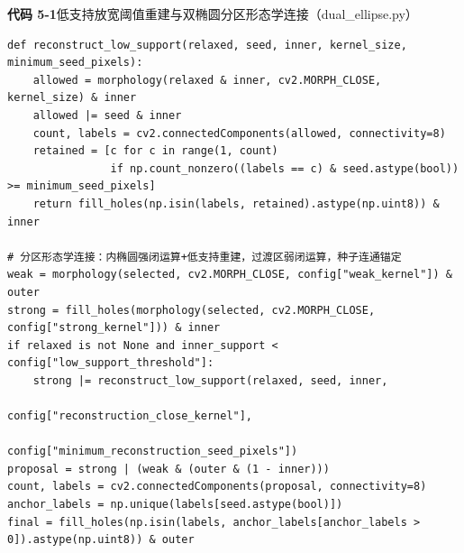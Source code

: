 \noindent\textbf{代码 5-1}\quad 低支持放宽阈值重建与双椭圆分区形态学连接（dual\_ellipse.py）
\begin{lstlisting}
def reconstruct_low_support(relaxed, seed, inner, kernel_size, minimum_seed_pixels):
    allowed = morphology(relaxed & inner, cv2.MORPH_CLOSE, kernel_size) & inner
    allowed |= seed & inner
    count, labels = cv2.connectedComponents(allowed, connectivity=8)
    retained = [c for c in range(1, count)
                if np.count_nonzero((labels == c) & seed.astype(bool)) >= minimum_seed_pixels]
    return fill_holes(np.isin(labels, retained).astype(np.uint8)) & inner

# 分区形态学连接：内椭圆强闭运算+低支持重建，过渡区弱闭运算，种子连通锚定
weak = morphology(selected, cv2.MORPH_CLOSE, config["weak_kernel"]) & outer
strong = fill_holes(morphology(selected, cv2.MORPH_CLOSE, config["strong_kernel"])) & inner
if relaxed is not None and inner_support < config["low_support_threshold"]:
    strong |= reconstruct_low_support(relaxed, seed, inner,
                                      config["reconstruction_close_kernel"],
                                      config["minimum_reconstruction_seed_pixels"])
proposal = strong | (weak & (outer & (1 - inner)))
count, labels = cv2.connectedComponents(proposal, connectivity=8)
anchor_labels = np.unique(labels[seed.astype(bool)])
final = fill_holes(np.isin(labels, anchor_labels[anchor_labels > 0]).astype(np.uint8)) & outer
\end{lstlisting}
